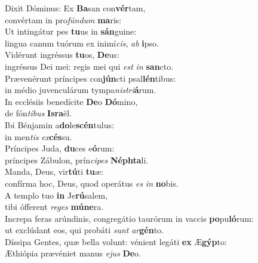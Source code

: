 \evenverse Dixit Dóminus: Ex \textbf{Ba}san con\textbf{vér}tam,~\*\\
\evenverse convértam in pro\textit{fún}\textit{dum} \textbf{ma}ris:\\
\oddverse Ut intingátur pes \textbf{tu}us in \textbf{sán}guine:~\*\\
\oddverse lingua canum tuórum ex inimí\textit{cis}, \textit{ab} \textbf{i}pso.\\
\evenverse Vidérunt ingréssus \textbf{tu}os, \textbf{De}us:~\*\\
\evenverse ingréssus Dei mei: regis mei qui \textit{est} \textit{in} \textbf{san}cto.\\
\oddverse Prævenérunt príncipes con\textbf{jún}cti psal\textbf{lén}tibus:~\*\\
\oddverse in médio juvenculárum tympa\textit{ni}\textit{stri}\textbf{á}rum.\\
\evenverse In ecclésiis benedícite \textbf{De}o \textbf{Dó}mino,~\*\\
\evenverse de fón\textit{ti}\textit{bus} \textbf{Is}\textbf{ra}ël.\\
\oddverse Ibi Bénjamin a\textbf{do}le\textbf{scén}tulus:~\*\\
\oddverse in men\textit{tis} \textit{ex}\textbf{cés}su.\\
\evenverse Príncipes Juda, \textbf{du}ces e\textbf{ó}rum:~\*\\
\evenverse príncipes Zábulon, prín\textit{ci}\textit{pes} \textbf{Né}\textbf{phta}li.\\
\oddverse Manda, Deus, vir\textbf{tú}ti \textbf{tu}æ:~\*\\
\oddverse confírma hoc, Deus, quod operátus \textit{es} \textit{in} \textbf{no}bis.\\
\evenverse A templo tuo \textbf{in} Je\textbf{rú}salem,~\*\\
\evenverse tibi ófferent \textit{re}\textit{ges} \textbf{mú}\textbf{ne}ra.\\
\oddverse Increpa feras arúndinis, congregátio taurórum in vaccis \textbf{po}pu\textbf{ló}rum:~\*\\
\oddverse ut exclúdant eos, qui probáti \textit{sunt} \textit{ar}\textbf{gén}to.\\
\evenverse Díssipa Gentes, quæ bella volunt: vénient legáti \textbf{ex} Æ\textbf{gýp}to:~\*\\
\evenverse Æthiópia prævéniet manus \textit{e}\textit{jus} \textbf{De}o.\\

